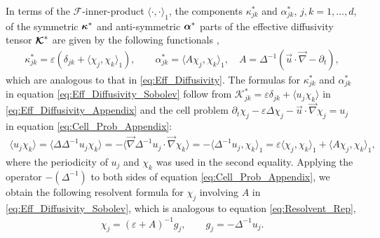\documentclass[11pt]{amsart}
\newcommand{\Kc}{\mathcal{K}}
\newcommand\Kbc{\mbox{\boldmath${\mathcal{K}}$}}
\newcommand{\Fc}{\mathcal{F}}
\newcommand\balpha{\mbox{\boldmath${\alpha}$}}
\newcommand\bkappa{\mbox{\boldmath${\kappa}$}}
\begin{document}
In terms of the $\Fc$-inner-product $\langle\cdot,\cdot\rangle_1$, the components
$\kappa^*_{jk}$ and $\alpha^*_{jk}$, $j,k=1,\ldots,d$, of the symmetric $\bkappa^*$
and anti-symmetric $\balpha^*$ parts of the effective diffusivity
tensor $\Kbc^*$ are given by the following functionals 
\cite{Pavliotis:PHD_Thesis},   
%
\begin{align}\label{eq:Eff_Diffusivity_Sobolev}
  \kappa^*_{jk}=\varepsilon(\delta_{jk}+\langle\chi_j,\chi_k\rangle_1), \qquad
  \alpha^*_{jk}=\langle A\chi_j,\chi_k\rangle_1, \quad
  A=\Delta^{-1}(\vec{u}\cdot\vec{\nabla}-\partial_t),
\end{align}
%
which are analogous to that in \eqref{eq:Eff_Diffusivity}.
The formulas for $\kappa^*_{jk}$ and $\alpha^*_{jk}$ in equation
\eqref{eq:Eff_Diffusivity_Sobolev} follow \cite{Pavliotis:PHD_Thesis}
from $\Kc^*_{jk}=\varepsilon\delta_{jk}+\langle u_j\chi_k\rangle$ in
\eqref{eq:Eff_Diffusivity_Appendix} and the cell problem
$\partial_t\chi_j-\varepsilon\Delta\chi_j-\vec{u}\cdot\vec{\nabla}\chi_j=u_j$ in equation \eqref{eq:Cell_Prob_Appendix}:
%
\begin{align}
  \langle u_j\chi_k\rangle=\langle\Delta\Delta^{-1}u_j\chi_k\rangle
       =-\langle\vec{\nabla}\Delta^{-1}u_j\cdot\vec{\nabla}\chi_k\rangle
       =-\langle\Delta^{-1}u_j,\chi_k\rangle_1
       =\varepsilon\langle\chi_j,\chi_k\rangle_1+\langle A\chi_j,\chi_k\rangle_1,
\end{align}
%
where the periodicity of $u_j$ and $\chi_k$ was used in the second equality.
Applying the operator $-(\Delta^{-1})$ to both sides of equation
\eqref{eq:Cell_Prob_Appendix}, we obtain the following resolvent
formula for $\chi_j$ involving $A$ in \eqref{eq:Eff_Diffusivity_Sobolev},
which is analogous to equation \eqref{eq:Resolvent_Rep},   
%
\begin{align}\label{eq:Resolvent_Rep_Scalar}
  \chi_j=(\varepsilon+A)^{-1}g_j, \qquad 
  g_j=-\Delta^{-1}u_j.
\end{align}
%
\end{document}
